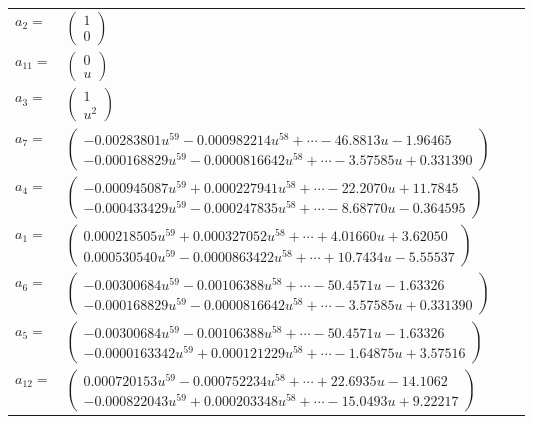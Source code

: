 \documentclass[1p]{elsarticle_modified}
\theoremstyle{definition}
\begin{document}
\begin{tabular}{m{7pt} m{180pt} m{7pt} m{180pt} }
\flushright $a_{2}=$&$\begin{pmatrix}1\\0\end{pmatrix}$ \\
\flushright $a_{11}=$&$\begin{pmatrix}0\\u\end{pmatrix}$ \\
\flushright $a_{3}=$&$\begin{pmatrix}1\\u^2\end{pmatrix}$ \\
\flushright $a_{7}=$&$\begin{pmatrix}-0.00283801 u^{59}-0.000982214 u^{58}+\cdots-46.8813 u-1.96465\\-0.000168829 u^{59}-0.0000816642 u^{58}+\cdots-3.57585 u+0.331390\end{pmatrix}$ \\
\flushright $a_{4}=$&$\begin{pmatrix}-0.000945087 u^{59}+0.000227941 u^{58}+\cdots-22.2070 u+11.7845\\-0.000433429 u^{59}-0.000247835 u^{58}+\cdots-8.68770 u-0.364595\end{pmatrix}$ \\
\flushright $a_{1}=$&$\begin{pmatrix}0.000218505 u^{59}+0.000327052 u^{58}+\cdots+4.01660 u+3.62050\\0.000530540 u^{59}-0.0000863422 u^{58}+\cdots+10.7434 u-5.55537\end{pmatrix}$ \\
\flushright $a_{6}=$&$\begin{pmatrix}-0.00300684 u^{59}-0.00106388 u^{58}+\cdots-50.4571 u-1.63326\\-0.000168829 u^{59}-0.0000816642 u^{58}+\cdots-3.57585 u+0.331390\end{pmatrix}$ \\
\flushright $a_{5}=$&$\begin{pmatrix}-0.00300684 u^{59}-0.00106388 u^{58}+\cdots-50.4571 u-1.63326\\-0.0000163342 u^{59}+0.000121229 u^{58}+\cdots-1.64875 u+3.57516\end{pmatrix}$ \\
\flushright $a_{12}=$&$\begin{pmatrix}0.000720153 u^{59}-0.000752234 u^{58}+\cdots+22.6935 u-14.1062\\-0.000822043 u^{59}+0.000203348 u^{58}+\cdots-15.0493 u+9.22217\end{pmatrix}$ \\

\end{tabular}
\end{document}
